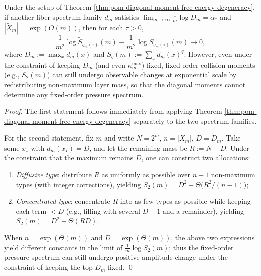 \begin{corollary}\label{cor:pom-diagonal-observation-strong-unidentifiability}
Under the setup of Theorem \ref{thm:pom-diagonal-moment-free-energy-degeneracy}, if another fiber spectrum family \(\tilde d_m\) satisfies
\(
\lim_{m\to\infty}\frac{1}{m}\log \tilde D_m=\alpha_*
\)
and \(|\tilde X_m|=\exp(O(m))\), then for each \(\tau>0\),
\[
\frac{1}{m^2}\log \tilde S_{q_m(\tau)}(m)-\frac{1}{m^2}\log S_{q_m(\tau)}(m)\to 0,
\]
where \(\tilde D_m:=\max_x \tilde d_m(x)\) and \(\tilde S_q(m):=\sum_x \tilde d_m(x)^q\).
However, even under the constraint of keeping \(D_m\) (and even \(\kappa_m^{\mathrm{max}}\)) fixed, fixed-order collision moments (e.g., \(S_2(m)\)) can still undergo observable changes at exponential scale by redistributing non-maximum layer mass, so that the diagonal moments cannot determine any fixed-order pressure spectrum.
\end{corollary}
\begin{proof}
The first statement follows immediately from applying Theorem \ref{thm:pom-diagonal-moment-free-energy-degeneracy} separately to the two spectrum families.
\par
For the second statement, fix \(m\) and write \(N=2^m\), \(n=|X_m|\), \(D=D_m\).
Take some \(x_\star\) with \(d_m(x_\star)=D\), and let the remaining mass be \(R:=N-D\).
Under the constraint that the maximum remains \(D\), one can construct two allocations:
\begin{enumerate}
  \item \emph{Diffusive type}: distribute \(R\) as uniformly as possible over \(n-1\) non-maximum types (with integer corrections), yielding
  \(
  S_2(m)=D^2+\Theta\!\bigl(R^2/(n-1)\bigr)
  \);
  \item \emph{Concentrated type}: concentrate \(R\) into as few types as possible while keeping each term \(<D\) (e.g., filling with several \(D-1\) and a remainder), yielding
  \(
  S_2(m)=D^2+\Theta(RD)
  \).
\end{enumerate}
When \(n=\exp(\Theta(m))\) and \(D=\exp(\Theta(m))\), the above two expressions yield different constants in the limit of \(\frac1m\log S_2(m)\); thus the fixed-order pressure spectrum can still undergo positive-amplitude change under the constraint of keeping the top \(D_m\) fixed. \qed
\end{proof}

